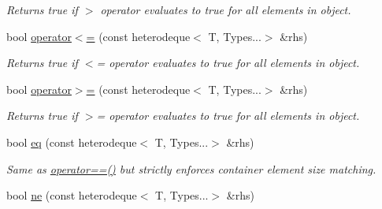 \begin{DoxyCompactItemize}
\begin{DoxyCompactList}\small\item\em Returns true if $>$ operator evaluates to true for all elements in object. \end{DoxyCompactList}\item 
\hypertarget{classheterogeneous_1_1heterodeque_3_01_t_00_01_types_8_8_8_4_a14f7ae738ffa66c0eeee3cafe9e5abe3}{}bool \hyperlink{classheterogeneous_1_1heterodeque_3_01_t_00_01_types_8_8_8_4_a14f7ae738ffa66c0eeee3cafe9e5abe3}{operator$<$=} (const heterodeque$<$ T, Types...$>$ \&rhs)\label{classheterogeneous_1_1heterodeque_3_01_t_00_01_types_8_8_8_4_a14f7ae738ffa66c0eeee3cafe9e5abe3}

\begin{DoxyCompactList}\small\item\em Returns true if $<$= operator evaluates to true for all elements in object. \end{DoxyCompactList}\item 
\hypertarget{classheterogeneous_1_1heterodeque_3_01_t_00_01_types_8_8_8_4_a1277be24def4b98760aa9649536d7268}{}bool \hyperlink{classheterogeneous_1_1heterodeque_3_01_t_00_01_types_8_8_8_4_a1277be24def4b98760aa9649536d7268}{operator$>$=} (const heterodeque$<$ T, Types...$>$ \&rhs)\label{classheterogeneous_1_1heterodeque_3_01_t_00_01_types_8_8_8_4_a1277be24def4b98760aa9649536d7268}

\begin{DoxyCompactList}\small\item\em Returns true if $>$= operator evaluates to true for all elements in object. \end{DoxyCompactList}\item 
\hypertarget{classheterogeneous_1_1heterodeque_3_01_t_00_01_types_8_8_8_4_a7156ac2b80787b70f1a98b5be916981c}{}bool \hyperlink{classheterogeneous_1_1heterodeque_3_01_t_00_01_types_8_8_8_4_a7156ac2b80787b70f1a98b5be916981c}{eq} (const heterodeque$<$ T, Types...$>$ \&rhs)\label{classheterogeneous_1_1heterodeque_3_01_t_00_01_types_8_8_8_4_a7156ac2b80787b70f1a98b5be916981c}

\begin{DoxyCompactList}\small\item\em Same as \hyperlink{classheterogeneous_1_1heterodeque_3_01_t_00_01_types_8_8_8_4_aaefe615f6a78c480091ee3ecdbede47c}{operator==()} but strictly enforces container element size matching. \end{DoxyCompactList}\item 
\hypertarget{classheterogeneous_1_1heterodeque_3_01_t_00_01_types_8_8_8_4_a068d4be004c558dbf546a1fb19295bbc}{}bool \hyperlink{classheterogeneous_1_1heterodeque_3_01_t_00_01_types_8_8_8_4_a068d4be004c558dbf546a1fb19295bbc}{ne} (const heterodeque$<$ T, Types...$>$ \&rhs)\label{classheterogeneous_1_1heterodeque_3_01_t_00_01_types_8_8_8_4_a068d4be004c558dbf546a1fb19295bbc}


\end{DoxyCompactItemize}
